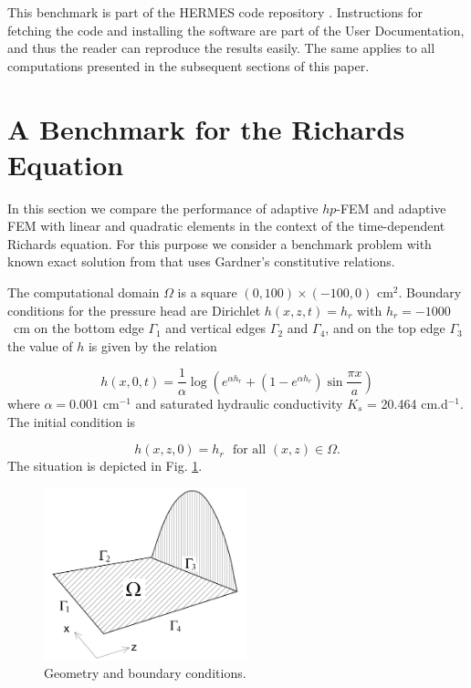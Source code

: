 \documentclass[final,3p,times,twocolumn]{elsarticle}
\begin{document}
This benchmark is part of the HERMES code
repository \cite{hermes-repo}. Instructions for fetching the code and installing 
the software are part of the User Documentation, and thus the reader can 
reproduce the results easily. The same applies to all computations 
presented in the subsequent sections of this paper.


\section{A Benchmark for the Richards Equation}
\label{sec:compar}

In this section we compare the performance of 
adaptive $hp$-FEM and adaptive FEM with linear and quadratic 
elements in the context of the time-dependent 
Richards equation. For this purpose we consider a 
benchmark problem with known exact solution from \cite{tracy1}
that uses Gardner's constitutive relations.

The computational domain $\Omega$ is a square $(0, 100)  \times (-100, 0)$ cm${}^2$. 
Boundary conditions for the pressure head are Dirichlet 
$h(x,z,t) = h_r$ with $h_r = -1000$~cm on the bottom edge $\Gamma_1$
and vertical edges $\Gamma_2$ and $\Gamma_4$, and on the 
top edge $\Gamma_3$ the value of $h$ is given by the relation


\begin{equation}\label{bc}
h(x,0,t) = \frac{1}{\alpha}\log \left(e^{\alpha h_r} + \left( 1- e^{\alpha h_r} \right)\sin \frac{\pi x}{a} \right)
\end{equation}
where $\alpha = 0.001$ cm${}^{-1}$ and saturated hydraulic conductivity 
$K_s$ = 20.464 cm.d${}^{-1}$. The initial condition is 

\begin{equation}\label{ic}
h(x,z,0) = h_r \  \ \ \mbox{for all } (x, z) \in \Omega.
\end{equation}
The situation is depicted in Fig. \ref{fig:geom}.

\begin{figure}[!ht]
\begin{center}
\includegraphics[height=5cm]{bench1.png}
\end{center}
\vspace{-6mm}
\caption{Geometry and boundary conditions.}
\label{fig:geom}
\end{figure}
\end{document}
